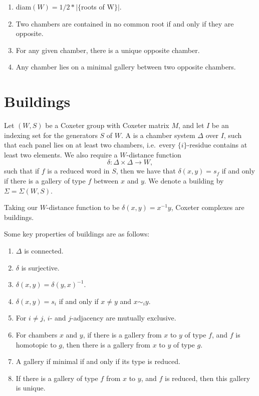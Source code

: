 \documentclass[11pt]{article}
\begin{document}
\begin{theorem}
    \begin{enumerate}
        \item diam$(W) = 1/2\ast |\{${roots of W}$\}|$. 
        \item Two chambers are contained in no common root if and only if they are opposite.
        \item For any given chamber, there is a unique opposite chamber.
        \item Any chamber lies on a minimal gallery between two opposite chambers.
    \end{enumerate}
\end{theorem}


\section{Buildings}

\begin{definition}
    Let $(W,S)$ be a Coxeter group with Coxeter matrix $M$, and let $I$ be an indexing set for the generators $S$ of $W$. A  is a chamber system $\Delta$ over $I$, such that each panel lies on at least two chambers, i.e.\ every $\{i\}$-residue contains at least two elements. We also require a $W$-distance function
    \[\delta:\Delta\times \Delta \to W,\]
    such that if $f$ is a reduced word in $S$, then we have that $\delta(x,y)=s_f$ if and only if there is a gallery of type $f$ between $x$ and $y$. We denote a building by $\Sigma=\Sigma(W,S)$. 
\end{definition}

\begin{example}
    Taking our $W$-distance function to be $\delta(x,y)=x^{-1}y$, Coxeter complexes are buildings.
\end{example}


Some key properties of buildings are as follows:
\begin{enumerate}
    \item $\Delta$ is connected.
    \item $\delta$ is surjective.
    \item $\delta(x,y)=\delta(y,x)^{-1}$.
    \item $\delta(x,y)=s_i$ if and only if $x\neq y$ and $x\sim_i y$.
    \item For $i\neq j$, $i$- and $j$-adjacency are mutually exclusive.
    \item For chambers $x$ and $y$, if there is a gallery from $x$ to $y$ of type $f$, and $f$ is homotopic to $g$, then there is a gallery from $x$ to $y$ of type $g$. 
    \item A gallery if minimal if and only if its type is reduced.
    \item If there is a gallery of type $f$ from $x$ to $y$, and $f$ is reduced, then this gallery is unique.
\end{enumerate}
\end{document}
